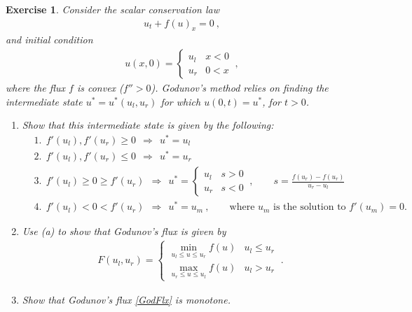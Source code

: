 \documentclass[10pt,letterpaper]{article}
\newcommand{\frb}[1]{ \left(  {#1} \right) }
\theoremstyle{break}
\newtheorem{exercise}{Exercise}
\begin{document}
\begin{exercise}
    Consider the scalar conservation law
    \begin{gather}%
        u_t+f(u)_x=0\ ,
    \end{gather}%
    and initial condition
    \begin{gather}%
        u(x,0)=\begin{cases}
            u_l & x<0\\
            u_r & 0<x
        \end{cases}\ ,
    \end{gather}%
    where the flux $f$ is convex ($f''>0$).
    Godunov's method relies on finding the intermediate state $u^*=u^*(u_l,u_r)$ for which $u(0,t)=u^*$, for $t>0$.
    \begin{enumerate}
    \item
    Show that this intermediate state is given by the following:
    \begin{align*}
        &1.\ \ f'(u_l), f'(u_r)\ge 0 \ \ \Longrightarrow \ \ u^*=u_l \\
        &2.\ \ f'(u_l), f'(u_r)\le 0 \ \ \Longrightarrow \ \ u^*=u_r \\[0.5em]
        &3.\ \ f'(u_l) \ge 0\ge f'(u_r) \ \ \Longrightarrow \ \
            u^*=\begin{cases}
                u_l & s>0 \\
                u_r & s<0
            \end{cases}\ ,
            \qquad s=\frac{f(u_r)-f(u_r)}{u_r-u_l}\\[0.5em]
        &4.\ \ f'(u_l) < 0 < f'(u_r)  \ \ \Longrightarrow \ \ u^*=u_m\ ,
            \qquad\text{where $u_m$ is the solution to $f'\frb{u_m}=0$.}
    \end{align*}

    \item
    Use (a) to show that Godunov's flux is given by
    \begin{gather} \label{GodFlx}
        F(u_l,u_r)=\begin{cases}
                \displaystyle
                \min_{u_l\le u\le u_r} f(u) & u_l\le u_r \\[1em]
                \displaystyle
                \max_{u_r\le u\le u_l} f(u) & u_l> u_r 
            \end{cases}\ .
    \end{gather}%
    \item
    Show that Godunov's flux \eqref{GodFlx} is monotone.
    \end{enumerate}
\end{exercise}
\end{document}

